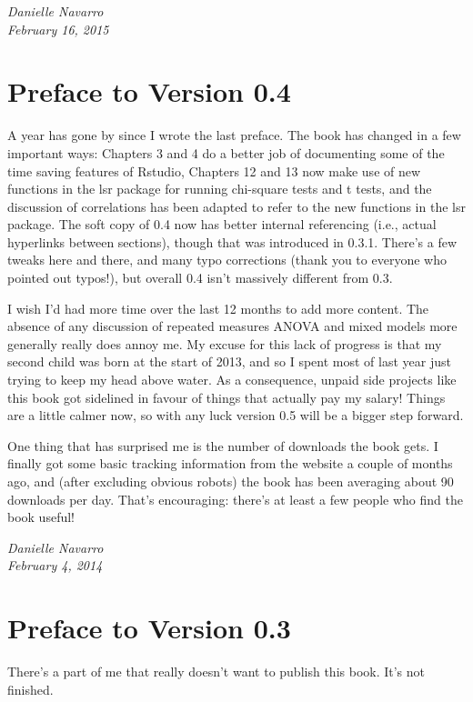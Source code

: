 \documentclass[
]{book}
\begin{document}
\emph{Danielle Navarro\\
February 16, 2015}

\hypertarget{preface-to-version-0.4}{%
\section*{Preface to Version 0.4}\label{preface-to-version-0.4}}

A year has gone by since I wrote the last preface. The book has changed
in a few important ways: Chapters 3 and 4 do a better job of documenting
some of the time saving features of Rstudio, Chapters 12 and 13 now make
use of new functions in the lsr package for running chi-square tests and
t tests, and the discussion of correlations has been adapted to refer to
the new functions in the lsr package. The soft copy of 0.4 now has
better internal referencing (i.e., actual hyperlinks between sections),
though that was introduced in 0.3.1. There's a few tweaks here and
there, and many typo corrections (thank you to everyone who pointed out
typos!), but overall 0.4 isn't massively different from 0.3.

I wish I'd had more time over the last 12 months to add more content.
The absence of any discussion of repeated measures ANOVA and mixed
models more generally really does annoy me. My excuse for this lack of
progress is that my second child was born at the start of 2013, and so I
spent most of last year just trying to keep my head above water. As a
consequence, unpaid side projects like this book got sidelined in favour
of things that actually pay my salary! Things are a little calmer now,
so with any luck version 0.5 will be a bigger step forward.

One thing that has surprised me is the number of downloads the book
gets. I finally got some basic tracking information from the website a
couple of months ago, and (after excluding obvious robots) the book has
been averaging about 90 downloads per day. That's encouraging: there's
at least a few people who find the book useful!

\emph{Danielle Navarro\\
February 4, 2014}

\hypertarget{preface-to-version-0.3}{%
\section*{Preface to Version 0.3}\label{preface-to-version-0.3}}

There's a part of me that really doesn't want to publish this book. It's
not finished.
\end{document}
